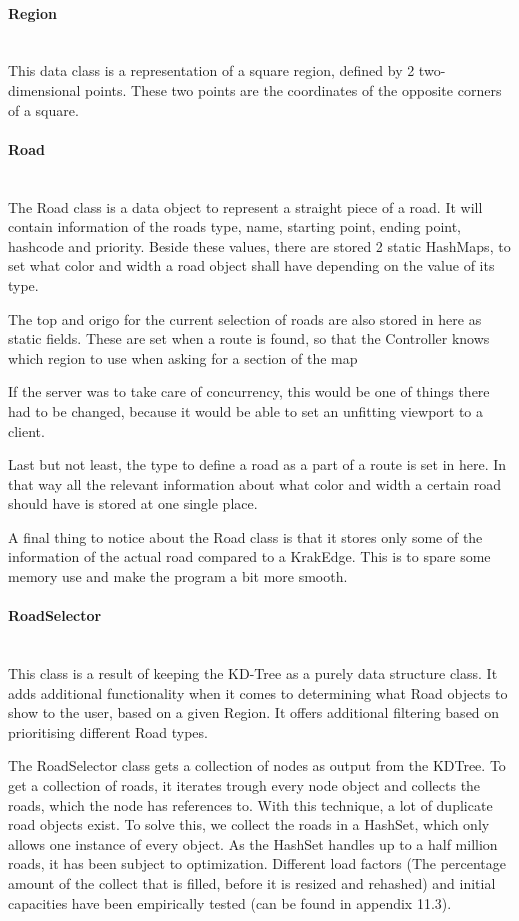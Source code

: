 \documentclass[a4paper,10pt,titlepage]{article}
\begin{document}
				\paragraph{Region}\mbox{}\\				
This data class is a representation of a square region, defined by 2 two-dimensional points. These two points are the coordinates of the opposite corners of a square.
				
				\paragraph{Road}\mbox{}\\				
The Road class is a data object to represent a straight piece of a road. It will contain information of the roads type, name, starting point, ending point, hashcode and priority. Beside these values, there are stored 2 static HashMaps, to set what color and width a road object shall have depending on the value of its type. 

The top and origo for the current selection of roads are also stored in here as static fields. These are set when a route is found, so that the Controller knows which region to use when asking for a section of the map

If the server was to take care of concurrency, this would be one of things there had to be changed, because it would be able to set an unfitting viewport to a client.

Last but not least, the type to define a road as a part of a route is set in here. In that way all the relevant information about what color and width a certain road should have is stored at one single place.

A final thing to notice about the Road class is that it stores only some of the information of the actual road compared to a KrakEdge. This is to spare some memory use and make the program a bit more smooth.

				
				\paragraph{RoadSelector}\mbox{}\\
This class is a result of keeping the KD-Tree as a purely data structure class. It adds additional functionality when it comes to determining what Road objects to show to the user, based on a given Region. It offers additional filtering based on prioritising different Road types.

The RoadSelector class gets a collection of nodes as output from the KDTree. To get a collection of roads, it iterates trough every node object and collects the roads, which the node has references to. With this technique, a lot of duplicate road objects exist. To solve this, we collect the roads in a HashSet, which only allows one instance of every object. As the HashSet handles up to a half million roads, it has been subject to optimization. Different load factors (The percentage amount of the collect that is filled, before it is resized and rehashed) and initial capacities have been empirically tested (can be found in appendix 11.3).
\end{document}
